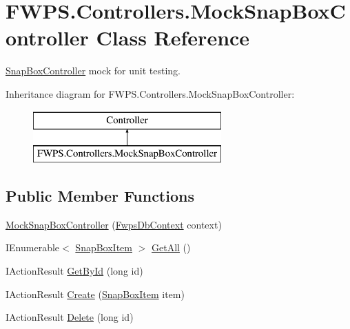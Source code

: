 \hypertarget{class_f_w_p_s_1_1_controllers_1_1_mock_snap_box_controller}{}\section{F\+W\+P\+S.\+Controllers.\+Mock\+Snap\+Box\+Controller Class Reference}
\label{class_f_w_p_s_1_1_controllers_1_1_mock_snap_box_controller}


\mbox{\hyperlink{class_f_w_p_s_1_1_controllers_1_1_snap_box_controller}{Snap\+Box\+Controller}} mock for unit testing.  


Inheritance diagram for F\+W\+P\+S.\+Controllers.\+Mock\+Snap\+Box\+Controller\+:\begin{figure}[H]
\begin{center}
\leavevmode
\includegraphics[height=2.000000cm]{class_f_w_p_s_1_1_controllers_1_1_mock_snap_box_controller}
\end{center}
\end{figure}
\subsection*{Public Member Functions}
\begin{DoxyCompactItemize}
\item 
\mbox{\hyperlink{class_f_w_p_s_1_1_controllers_1_1_mock_snap_box_controller_a46c3a0f34d0ad6d3e14bd6875b80f815}{Mock\+Snap\+Box\+Controller}} (\mbox{\hyperlink{class_f_w_p_s_1_1_data_1_1_fwps_db_context}{Fwps\+Db\+Context}} context)
\item 
I\+Enumerable$<$ \mbox{\hyperlink{class_f_w_p_s_1_1_models_1_1_snap_box_item}{Snap\+Box\+Item}} $>$ \mbox{\hyperlink{class_f_w_p_s_1_1_controllers_1_1_mock_snap_box_controller_a6ae5e22a8b01d3981d6ac98738b8fe8f}{Get\+All}} ()
\item 
I\+Action\+Result \mbox{\hyperlink{class_f_w_p_s_1_1_controllers_1_1_mock_snap_box_controller_a765ea498d1588c5d03962b314d6a8ea9}{Get\+By\+Id}} (long id)
\item 
I\+Action\+Result \mbox{\hyperlink{class_f_w_p_s_1_1_controllers_1_1_mock_snap_box_controller_a96d77432a59ef34a674e4cd9d2a1fb0d}{Create}} (\mbox{\hyperlink{class_f_w_p_s_1_1_models_1_1_snap_box_item}{Snap\+Box\+Item}} item)
\item 
I\+Action\+Result \mbox{\hyperlink{class_f_w_p_s_1_1_controllers_1_1_mock_snap_box_controller_a1270e91f496ec0aa62b67421dc78a7eb}{Delete}} (long id)
\end{DoxyCompactItemize}

